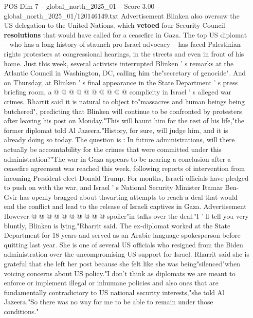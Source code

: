 \begin{textsample}{POS Dim 7 – global\_north\_2025\_01 – Score 3.00 – global\_north\_2025\_01/120146149.txt}
Advertisement Blinken also oversaw the US delegation to the United Nations, which \textbf{vetoed} four Security Council \textbf{resolutions} that would have called for a ceasefire in Gaza.
The top US diplomat -- who has a long history of staunch pro-Israel advocacy -- has faced Palestinian rights protesters at congressional hearings, in the streets and even in front of his home.
Just this week, several activists interrupted Blinken ' s remarks at the Atlantic Council in Washington, DC, calling him the"secretary of genocide".
And on Thursday, at Blinken ' s final appearance in the State Department ' s press briefing room, a @ @ @ @ @ @ @ @ @ @ complicity in Israel ' s alleged war crimes.
Rharrit said it is natural to object to"massacres and human beings being butchered", predicting that Blinken will continue to be confronted by protesters after leaving his post on Monday."This will haunt him for the rest of his life,"the former diplomat told Al Jazeera."History, for sure, will judge him, and it is already doing so today.
The question is : In future administrations, will there actually be accountability for the crimes that were committed under this administration?"The war in Gaza appears to be nearing a conclusion after a ceasefire agreement was reached this week, following reports of intervention from incoming President-elect Donald Trump.
For months, Israeli officials have pledged to push on with the war, and Israel ' s National Security Minister Itamar Ben-Gvir has openly bragged about thwarting attempts to reach a deal that would end the conflict and lead to the release of Israeli captives in Gaza.
Advertisement However @ @ @ @ @ @ @ @ @ @ spoiler"in talks over the deal."I ' ll tell you very bluntly, Blinken is lying,"Rharrit said.
The ex-diplomat worked at the State Department for 18 years and served as an Arabic language spokesperson before quitting last year.
She is one of several US officials who resigned from the Biden administration over the uncompromising US support for Israel.
Rharrit said she is grateful that she left her post because she felt like she was being"silenced"when voicing concerns about US policy."I don't think as diplomats we are meant to enforce or implement illegal or inhumane policies and also ones that are fundamentally contradictory to US national security interests,"she told Al Jazeera."So there was no way for me to be able to remain under those conditions."

\end{textsample}
